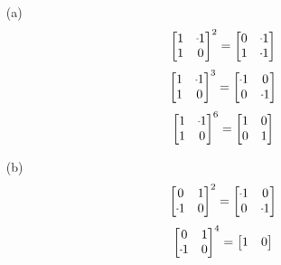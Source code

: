 \begin{mdframed}[style=darkAnswer,frametitle={Joe Starr}]
  \begin{multicols}{2}
    \begin{itemize}
      \item[(a)]{ 
                  $$\begin{bmatrix}1 & \m 1 \\ 
                    1 & 0 \\
                  \end{bmatrix}^2=\begin{bmatrix}0 & \m 1 \\ 
                  1 & \m 1\\
            \end{bmatrix}$$ 
            $$\begin{bmatrix}1 & \m 1 \\ 
              1 & 0 \\
            \end{bmatrix}^3=\begin{bmatrix}\m 1 & 0 \\ 
            0 & \m 1\\
      \end{bmatrix}$$
      $$\begin{bmatrix}1 & \m 1 \\ 
        1 & 0 \\
      \end{bmatrix}^6=\begin{bmatrix}1 & 0 \\ 
      0 & 1\\
\end{bmatrix}$$
      }
    \item[(b)]{ 
                $$\begin{bmatrix}0 & 1 \\ 
                  \m 1 & 0 \\
                \end{bmatrix}^2=\begin{bmatrix}\m 1 & 0 \\ 
                  0 & \m 1\\
            \end{bmatrix}$$
            $$\begin{bmatrix}0 & 1 \\ 
              \m 1 & 0 \\
            \end{bmatrix}^4=\begin{bmatrix}1 & 0 \\ 

\end{bmatrix}$$}
\end{itemize}
\end{multicols}
\end{mdframed}
